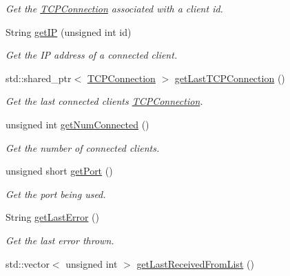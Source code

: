 \begin{DoxyCompactItemize}
\begin{DoxyCompactList}\small\item\em Get the \hyperlink{class_rad_jav_1_1_networking_1_1_t_c_p_connection}{T\+C\+P\+Connection} associated with a client id. \end{DoxyCompactList}\item 
String \hyperlink{class_rad_jav_1_1_networking_1_1_tcpip_server_acd0e08a87666efa5078828f3b1834dc6}{get\+IP} (unsigned int id)
\begin{DoxyCompactList}\small\item\em Get the IP address of a connected client. \end{DoxyCompactList}\item 
std\+::shared\+\_\+ptr$<$ \hyperlink{class_rad_jav_1_1_networking_1_1_t_c_p_connection}{T\+C\+P\+Connection} $>$ \hyperlink{class_rad_jav_1_1_networking_1_1_tcpip_server_ae0c90ba703056aacc124db14899f6574}{get\+Last\+T\+C\+P\+Connection} ()
\begin{DoxyCompactList}\small\item\em Get the last connected client\textquotesingle{}s \hyperlink{class_rad_jav_1_1_networking_1_1_t_c_p_connection}{T\+C\+P\+Connection}. \end{DoxyCompactList}\item 
unsigned int \hyperlink{class_rad_jav_1_1_networking_1_1_tcpip_server_a3b785bc5b7f9fa9311de6706c160433d}{get\+Num\+Connected} ()
\begin{DoxyCompactList}\small\item\em Get the number of connected clients. \end{DoxyCompactList}\item 
unsigned short \hyperlink{class_rad_jav_1_1_networking_1_1_tcpip_server_aa286bba2ea1681f59b73e0e22c3c3ae4}{get\+Port} ()
\begin{DoxyCompactList}\small\item\em Get the port being used. \end{DoxyCompactList}\item 
String \hyperlink{class_rad_jav_1_1_networking_1_1_tcpip_server_a1d030a2b0f1d38f313c5316e54ca720c}{get\+Last\+Error} ()
\begin{DoxyCompactList}\small\item\em Get the last error thrown. \end{DoxyCompactList}\item 
std\+::vector$<$ unsigned int $>$ \hyperlink{class_rad_jav_1_1_networking_1_1_tcpip_server_a7c81f5e082f27fabd701b4bc67a12f82}{get\+Last\+Received\+From\+List} ()

\end{DoxyCompactItemize}
